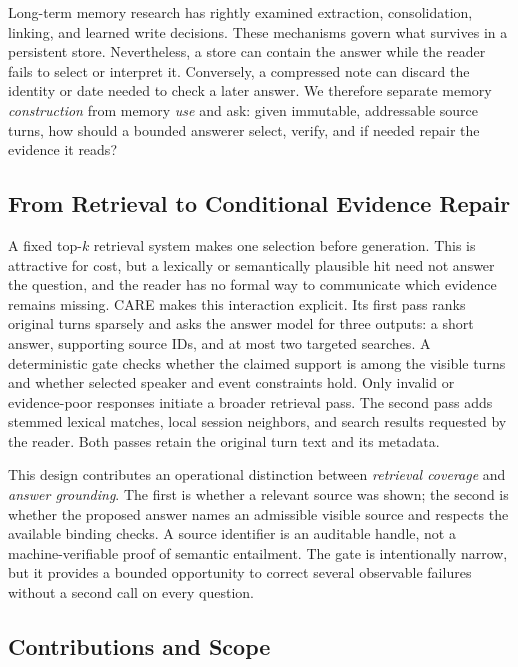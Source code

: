 \documentclass[11pt]{article}
\newcommand{\care}{\textsc{CARE}}
\begin{document}
Long-term memory research has rightly examined extraction, consolidation,
linking, and learned write decisions. These mechanisms govern what survives
in a persistent store. Nevertheless, a store can contain the answer while
the reader fails to select or interpret it. Conversely, a compressed note
can discard the identity or date needed to check a later answer. We therefore
separate memory \emph{construction} from memory \emph{use} and ask: given
immutable, addressable source turns, how should a bounded answerer select,
verify, and if needed repair the evidence it reads?

\subsection{From Retrieval to Conditional Evidence Repair}

A fixed top-$k$ retrieval system makes one selection before generation. This
is attractive for cost, but a lexically or semantically plausible hit need
not answer the question, and the reader has no formal way to communicate
which evidence remains missing. \care{} makes this interaction explicit.
Its first pass ranks original turns sparsely and asks the answer model for
three outputs: a short answer, supporting source IDs, and at most two
targeted searches. A deterministic gate checks whether the claimed support
is among the visible turns and whether selected speaker and event constraints
hold. Only invalid or evidence-poor responses initiate a broader retrieval
pass. The second pass adds stemmed lexical matches, local session neighbors,
and search results requested by the reader. Both passes retain the original
turn text and its metadata.

This design contributes an operational distinction between \emph{retrieval
coverage} and \emph{answer grounding}. The first is whether a relevant
source was shown; the second is whether the proposed answer names an
admissible visible source and respects the available binding checks. A
source identifier is an auditable handle, not a machine-verifiable proof of
semantic entailment. The gate is intentionally narrow, but it provides a
bounded opportunity to correct several observable failures without a
second call on every question.

\subsection{Contributions and Scope}
\end{document}
